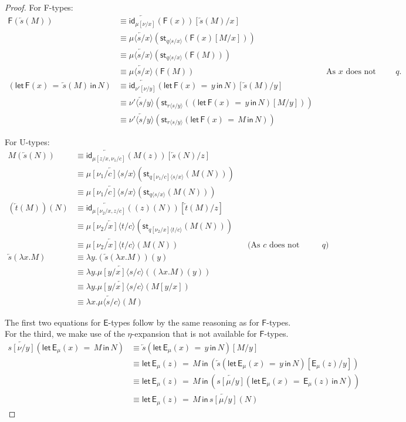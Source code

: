 \documentclass[10pt]{article}
\theoremstyle{definition}
\newcommand{\id}{\mathsf{id}}
\newcommand{\rewrite}[2]{\overleftarrow{#1}(#2)}
\newcommand\UE[2]{\ensuremath{#1(#2)}}
\newcommand\UI[2]{\ensuremath{\lambda #1.#2}}
\newcommand\StI[2]{\ensuremath{\mathsf{st}_{#1}(#2)}}
\newcommand\FE[3]{\ensuremath{\mathsf{let} \, \mathsf{F}(#2) \, = \, {#1} \, \mathsf{in} \, #3}}
\newcommand\FI[1]{\ensuremath{\mathsf{F}{(#1)}}}
\newcommand\EEs[4]{\ensuremath{\mathsf{let} \, \mathsf{E}_{#1}(#3) \, = \, {#2} \, \mathsf{in} \, #4}}
\newcommand\EIs[2]{\ensuremath{\mathsf{E}_{#1}{(#2)}}}
\newcommand\ap[2]{\ensuremath{#1 \langle #2 \rangle }}
\begin{document}
\begin{proof}
For \textsf{F}-types:
\begin{align*}
\FI{\rewrite{s}{M}} 
&\equiv \rewrite{\id_{\mu[\nu/x]}}{\FI{x}}[\rewrite{s}{M}/x]  \\
&\equiv \rewrite{\ap{\mu}{s/x}}{\StI{\ap{q}{s/x}}{\FI{x}[M/x]}} \\
&\equiv \rewrite{\ap{\mu}{s/x}}{\StI{\ap{q}{s/x}}{\FI{M}}} \\
&\equiv \rewrite{\ap{\mu}{s/x}}{\FI{M}} && \text{As $x$ does not appear in $q$.}\\
(\FE{\rewrite{s}{M}}{x}{N})
&\equiv \rewrite{\id_{\nu'[\nu/y]}}{\FE{y}{x}{N}}[\rewrite{s}{M}/y] \\
&\equiv \rewrite{\ap{\nu'}{s/y}}{\StI{\ap{r}{s/y}}{(\FE{y}{x}{N})[M/y]}} \\
&\equiv \rewrite{\ap{\nu'}{s/y}}{\StI{\ap{r}{s/y}}{\FE{M}{x}{N}}}
\end{align*}

For \textsf{U}-types:
\begin{align*}
\UE{M}{\rewrite{s}{N}}
&\equiv \rewrite{\id_{\mu[z/x, \nu_1/c]}}{\UE{M}{z}}[\rewrite{s}{N}/z] \\
&\equiv \rewrite{\ap{\mu[\nu_1/c]}{s/x}}{\StI{\ap{q[\nu_1/c]}{s/x}}{\UE{M}{N}}} \\
&\equiv \rewrite{\ap{\mu[\nu_1/c]}{s/x}}{\StI{\ap{q}{s/x}}{\UE{M}{N}}} \\
\UE{(\rewrite{t}{M})}{N}
&\equiv \rewrite{\id_{\mu[\nu_2/x, z/c]}}{\UE{(z)}{N}}[\rewrite{t}{M}/z] \\
&\equiv \rewrite{\ap{\mu[\nu_2/x]}{t/c}}{\StI{\ap{q[\nu_2/x]}{t/c}}{\UE{M}{N}}} \\
&\equiv \rewrite{\ap{\mu[\nu_2/x]}{t/c}}{\UE{M}{N}} && \text{(As $c$ does not appear in $q$)}\\
\rewrite{s}{\UI{x}{M}}
&\equiv \UI{y}{\UE{(\rewrite{s}{\UI{x}{M}})}{y}} \\
&\equiv \UI{y}{\rewrite{\ap{\mu[y/x]}{s/c}}{\UE{(\UI{x}{M})}{y}}} \\
&\equiv \UI{y}{\rewrite{\ap{\mu[y/x]}{s/c}}{M[y/x]}} \\
&\equiv \UI{x}{\rewrite{\ap{\mu}{s/c}}{M}}
\end{align*}

The first two equations for $\mathsf{E}$-types follow by the same reasoning as for $\mathsf{F}$-types. For the third, we make use of the $\eta$-expansion that is not available for $\mathsf{F}$-types.
\begin{align*}
\rewrite{s[\nu/y]}{\EEs{\mu}{M}{x}{N}}
&\equiv \rewrite{s}{\EEs{\mu}{y}{x}{N}} [M/y] \\
&\equiv \EEs{\mu}{M}{z}{(\rewrite{s}{\EEs{\mu}{y}{x}{N}}[\EIs{\mu}{z}/y])} \\
&\equiv \EEs{\mu}{M}{z}{(\rewrite{s[\mu/y]}{\EEs{\mu}{\EIs{\mu}{z}}{x}{N}})} \\
&\equiv \EEs{\mu}{M}{z}{\rewrite{s[\mu/y]}{N}}
\end{align*}
\end{proof}
\end{document}
